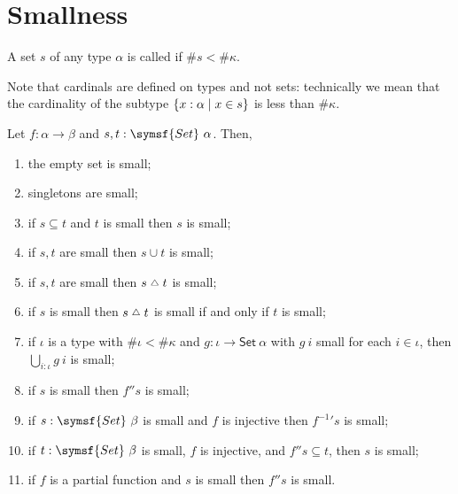 \section{Smallness}

\begin{definition}
    A set \( s \) of any type \( \alpha \) is called  if \( \#s < \#\kappa \).
\end{definition}
\begin{remark}
    Note that cardinals are defined on types and not sets: technically we mean that the cardinality of the subtype \( \qty{x : \alpha \mid x \in s} \) is less than \( \#\kappa \).
\end{remark}
\begin{lemma}
    \label{lem:small}
    Let \( f \colon \alpha \to \beta \) and \( s, t : \symsf{Set}\ \alpha \).
    Then,
    \begin{enumerate}
        \item the empty set is small;
        \item singletons are small;
        \item if \( s \subseteq t \) and \( t \) is small then \( s \) is small;
        \item if \( s, t \) are small then \( s \cup t \) is small;
        \item if \( s, t \) are small then \( s \symmdiff t \) is small;
        \item if \( s \) is small then \( s \symmdiff t \) is small if and only if \( t \) is small;
        \item if \( \iota \) is a type with \( \#\iota < \#\kappa \) and \( g \colon \iota \to \mathsf{Set}\ \alpha \) with \( g\ i \) small for each \( i \in \iota \), then \( \bigcup_{i : \iota} g\ i \) is small;
        \item if \( s \) is small then \( f '' s \) is small;
        \item if \( s : \symsf{Set}\ \beta \) is small and \( f \) is injective then \( f^{-1}{}' s \) is small;
        \item if \( t : \symsf{Set}\ \beta \) is small, \( f \) is injective, and \( f '' s \subseteq t \), then \( s \) is small;
        \item if \( f \) is a partial function and \( s \) is small then \( f '' s \) is small.
    \end{enumerate}
\end{lemma}

